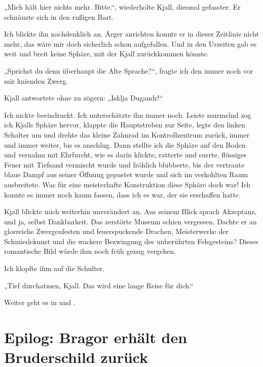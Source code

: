 „Mich hält hier nichts mehr. Bitte.“, wiederholte Kjall, diesmal gefasster. Er schnäuzte sich in den rußigen Bart.

Ich blickte ihn nachdenklich an. Ärger anrichten konnte er in dieser Zeitlinie nicht mehr, das wäre mir doch sicherlich schon aufgefallen. Und in den Urzeiten gab es weit und breit keine Sphäre, mit der Kjall zurückkommen könnte.

„Sprichst du denn überhaupt die Alte Sprache?“, fragte ich den immer noch vor mir knienden Zwerg.

Kjall antwortete ohne zu zögern: „Isklja Dugandr!“

Ich nickte beeindruckt. Ich unterschätzte ihn immer noch. Leiste murmelnd zog ich Kjalls Sphäre hervor, klappte die Hauptstreben zur Seite, legte den linken Schalter um und drehte das kleine Zahnrad im Kontrollzentrum zurück, immer und immer weiter, bis es anschlug. Dann stellte ich die Sphäre auf den Boden und vernahm mit Ehrfurcht, wie es darin klickte, ratterte und surrte, flüssiges Feuer mit Tiefsand vermischt wurde und fröhlich blubberte, bis der vertraute blaue Dampf aus seiner Öffnung gepustet wurde und sich im verkohlten Raum ausbreitete. Was für eine meisterhafte Konstruktion diese Sphäre doch war! Ich konnte es immer noch kaum fassen, dass ich es war, der sie erschaffen hatte.

Kjall blickte mich weiterhin unverändert an. Aus seinem Blick sprach Akzeptanz, und ja, selbst Dankbarkeit. Das zerstörte Museum schien vergessen. Dachte er an glorreiche Zwergenfesten und feuerspuckende Drachen, Meisterwerke der Schmiedekunst und die wackere Bezwingung des unberührten Felsgesteins? Dieses romantische Bild würde ihm noch früh genug vergehen.

Ich klopfte ihm auf die Schulter.

„Tief durchatmen, Kjall. Das wird eine lange Reise für dich.“


\begin{center}
    Weiter geht es in  und .
\end{center}








\newpage
\section{Epilog: Bragor erhält den Bruderschild zurück}

